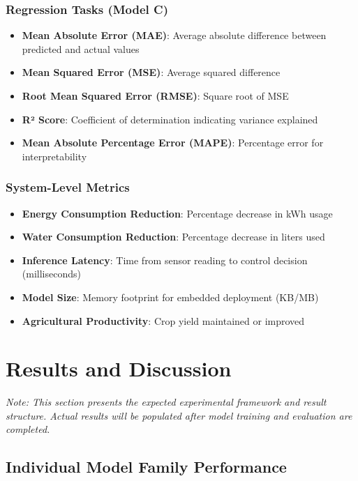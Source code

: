\documentclass[conference]{IEEEtran}
\begin{document}
\subsubsection{Regression Tasks (Model C)}
\begin{itemize}
\item \textbf{Mean Absolute Error (MAE)}: Average absolute difference between predicted and actual values
\item \textbf{Mean Squared Error (MSE)}: Average squared difference
\item \textbf{Root Mean Squared Error (RMSE)}: Square root of MSE
\item \textbf{R² Score}: Coefficient of determination indicating variance explained
\item \textbf{Mean Absolute Percentage Error (MAPE)}: Percentage error for interpretability
\end{itemize}

\subsubsection{System-Level Metrics}
\begin{itemize}
\item \textbf{Energy Consumption Reduction}: Percentage decrease in kWh usage
\item \textbf{Water Consumption Reduction}: Percentage decrease in liters used
\item \textbf{Inference Latency}: Time from sensor reading to control decision (milliseconds)
\item \textbf{Model Size}: Memory footprint for embedded deployment (KB/MB)
\item \textbf{Agricultural Productivity}: Crop yield maintained or improved
\end{itemize}

\section{Results and Discussion}

\textit{Note: This section presents the expected experimental framework and result structure. Actual results will be populated after model training and evaluation are completed.}

\subsection{Individual Model Family Performance}
\end{document}
